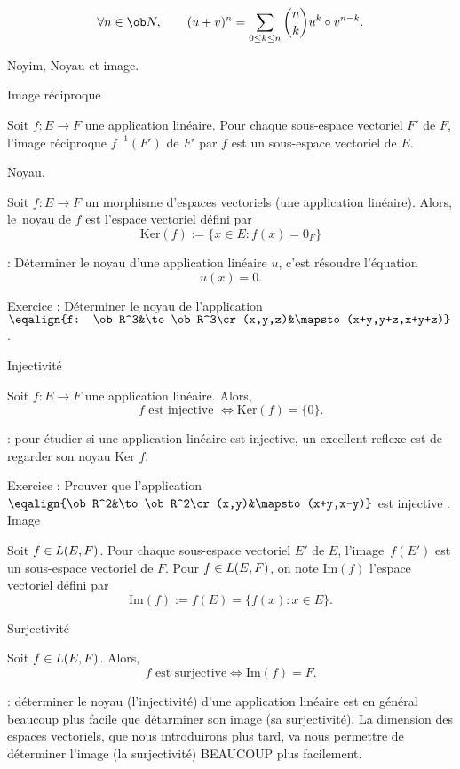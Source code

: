 \Theoreme [Title=bin\^ome de Newton;$u$ et $v$ endomorphismes v\'erifiant {$u\circ v=v\circ u$}] 
$$
\forall n\in\ob N, \qquad {(u+v)^n=\sum_{0\le k\le n}{n\choose k}u^k\circ v^{n-k}}.
$$

\Subsection Noyim, Noyau et image.

\Concept [] Image r\'eciproque

Soit $f:E\to F$ une application lin\'eaire. Pour chaque sous-espace vectoriel $F'$ de $F$, 
l'image r\'eciproque $f^{-1}(F')$ de $F'$ par $f$ est un sous-espace vectoriel de $E$. 
\bigskip

\Concept [] Noyau.

\noindent
Soit $f:E\to F$ un morphisme d'espaces vectoriels (une application lin\'eaire). Alors, le~noyau de $f$ 
est l'espace vectoriel d\'efini par 
$${
\mbox{Ker}(f):=\{x\in E:f(x)=0_F\}}
$$ 

\Remarque : D\'eterminer le noyau d'une application lin\'eaire $u$, c'est r\'esoudre l'\'equation 
$$
u(x)=0.
$$ 
\bigskip


 Exercice :  D\'eterminer le noyau de l'application $\eqalign{f: \ob R^3&\to\ob R^3\cr(x,y,z)&\mapsto  (x+y,y+z,x+y+z)}$. 
\bigskip

\Concept [] Injectivit\'e

\noindent
Soit $f:E\to F$ une application lin\'eaire. Alors, 
$${
f\mbox{ est injective }\Longleftrightarrow \mbox{Ker}(f)=\{0\}}.
$$ 


\Remarque : pour \'etudier si une application lin\'eaire est injective, un excellent reflexe est de regarder son noyau $\mbox{Ker }f$. 
\bigskip

 Exercice :  Prouver que l'application $\eqalign{\ob R^2&\to\ob R^2\cr(x,y)&\mapsto  (x+y,x-y)}$ est injective .
\bigskip
\Concept [] Image 

\Propriete []  Soit $f\in\sc L(E,F)$. Pour chaque sous-espace vectoriel $E'$ de $E$, l'image~$f(E')$ est un sous-espace vectoriel de $F$. 
\bigskip
\noindent
Pour $f\in\sc L(E,F)$, on note $\mbox{Im}(f)$ l'espace vectoriel d\'efini par 
$$
{\mbox{Im}(f):=f(E)=\{f(x):x\in E\}}.
$$

\Concept [] Surjectivit\'e

\Propriete []  Soit $f\in\sc L(E,F)$. Alors, 
$$
f\mbox{ est surjective}\Longleftrightarrow \mbox{Im}(f)=F. 
$$

\Remarque : d\'eterminer le noyau (l'injectivit\'e) d'une application lin\'eaire est en g\'en\'eral beaucoup plus facile que d\'etarminer son image (sa surjectivit\'e). La dimension des espaces vectoriels, que nous introduirons plus tard, va nous permettre de d\'eterminer l'image (la surjectivit\'e) BEAUCOUP plus facilement. 
\bigskip

